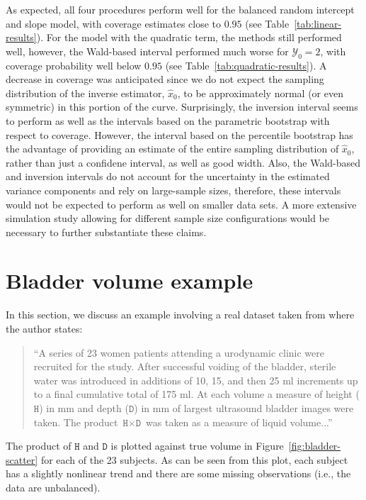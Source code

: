 \documentclass[cmfont,usenames,dvipsnames,leqno]{afit-etd}\usepackage[]{graphicx}\usepackage[]{color}
\begin{document}
As expected, all four procedures perform well for the balanced random intercept and slope model, with coverage estimates close to $0.95$ (see Table~\ref{tab:linear-results}). For the model with the quadratic term, the methods still performed well, however, the Wald-based interval performed much worse for $\mathcal{Y}_0 = 2$, with coverage probability well below $0.95$ (see Table~\ref{tab:quadratic-results}). A decrease in coverage was anticipated since we do not expect the sampling distribution of the inverse estimator, $\widehat{x}_0$, to be approximately normal (or even symmetric) in this portion of the curve. Surprisingly, the inversion interval seems to perform as well as the intervals based on the parametric bootstrap with respect to coverage. However, the interval based on the percentile bootstrap has the advantage of providing an estimate of the entire sampling distribution of $\widehat{x}_0$, rather than just a confidene interval, as well as good width. Also, the Wald-based and inversion intervals do not account for the uncertainty in the estimated variance components and rely on large-sample sizes, therefore, these intervals would not be expected to perform as well on smaller data sets. A more extensive simulation study allowing for different sample size configurations would be necessary to further substantiate these claims.

\section{Bladder volume example}
\label{sec:bladder-example}
In this section, we discuss an example involving a real dataset taken from \citet{brown_measurement_1993} where the author states:
\begin{quotation}
\noindent``A series of 23 women patients attending a urodynamic clinic were recruited for the study. After successful voiding of the bladder, sterile water was introduced in additions of 10, 15, and then 25 ml increments up to a final cumulative total of 175 ml. At each volume a measure of height ($\texttt{H}$) in mm and depth ($\texttt{D}$) in mm of largest ultrasound bladder images were taken. The product $\texttt{H} \times \texttt{D}$ was taken as a measure of liquid volume...''
\end{quotation}
The product of $\texttt{H}$ and $\texttt{D}$ is plotted against true volume in Figure~\ref{fig:bladder-scatter} for each of the 23 subjects. As can be seen from this plot, each subject has a slightly nonlinear trend and there are some missing observations (i.e., the data are unbalanced). 
\end{document}
